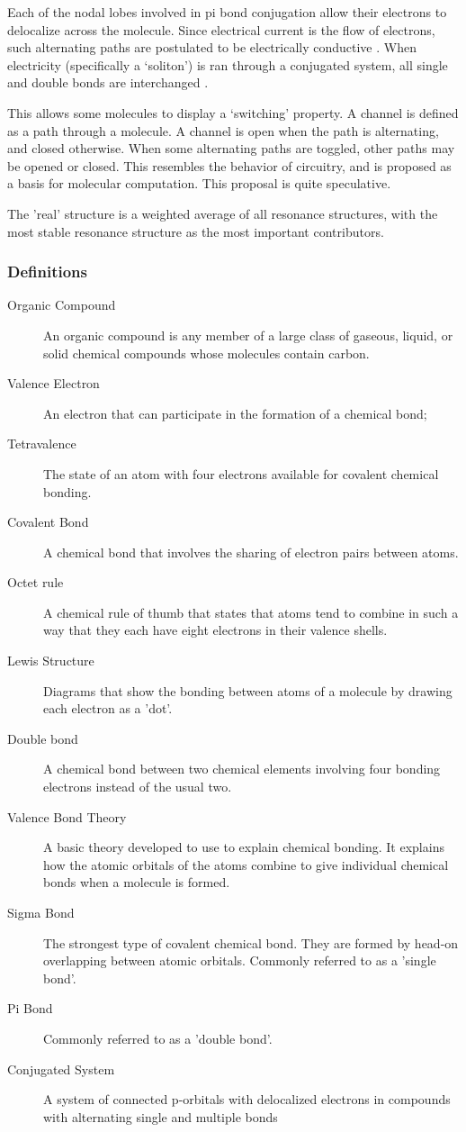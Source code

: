 \documentclass[12pt]{article}
\begin{document}
Each of the nodal lobes involved in pi bond conjugation allow their electrons to delocalize across the molecule. Since electrical current is the flow of electrons, such alternating paths are postulated to be electrically conductive \cite{H13,HK88}. When electricity (specifically a `soliton') is ran through a conjugated system, all single and double bonds are interchanged \cite{HK88}. 

This allows some molecules to display a `switching' property. A channel is defined as a path through a molecule. A channel is open when the path is alternating, and closed otherwise. When some alternating paths are toggled, other paths may be opened or closed. This resembles the behavior of circuitry, and is proposed as a basis for molecular computation. This proposal is quite speculative.

The 'real' structure is a weighted average of all resonance structures, with the most stable resonance structure as the most important contributors. 

\subsubsection{Definitions}

\begin{description}
\item[Organic Compound] An organic compound is any member of a large class of gaseous, liquid, or solid chemical compounds whose molecules contain carbon.
\item[Valence Electron] An electron that can participate in the formation of a chemical bond; 
\item[Tetravalence] The state of an atom with four electrons available for covalent chemical bonding.
\item[Covalent Bond] A chemical bond that involves the sharing of electron pairs between atoms.
\item[Octet rule] A chemical rule of thumb that states that atoms tend to combine in such a way that they each have eight electrons in their valence shells.
\item[Lewis Structure] Diagrams that show the bonding between atoms of a molecule by drawing each electron as a 'dot'.
\item[Double bond] A chemical bond between two chemical elements involving four bonding electrons instead of the usual two.
\item[Valence Bond Theory] A basic theory developed to use to explain chemical bonding. It explains how the atomic orbitals of the atoms combine to give individual chemical bonds when a molecule is formed. 
\item[Sigma Bond] The strongest type of covalent chemical bond. They are formed by head-on overlapping between atomic orbitals. Commonly referred to as a 'single bond'.
\item[Pi Bond] Commonly referred to as a 'double bond'.
\item[Conjugated System] A system of connected p-orbitals with delocalized electrons in compounds with alternating single and multiple bonds
\end{description}
\end{document}
